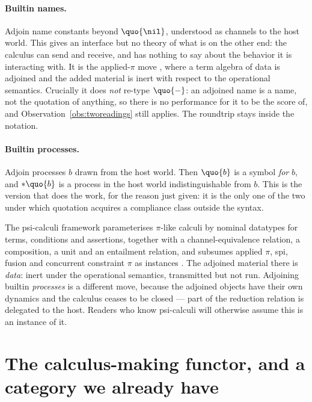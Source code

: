 \paragraph{Builtin names.}
Adjoin name constants beyond $\quo{\nil}$, understood as channels
to the host world.
This gives an interface but no theory of what is on the other end:
the calculus can send and receive, and has nothing to say about the
behavior it is interacting with.
It is the applied-$\pi$ move \cite{abadi2001}, where a term algebra
of data is adjoined and the added material is inert with respect to
the operational semantics.
Crucially it does \emph{not} re-type $\quo{-}$: an adjoined name is
a name, not the quotation of anything, so there is no performance
for it to be the score of, and Observation~\ref{obs:tworeadings}
still applies.
The roundtrip stays inside the notation.

\paragraph{Builtin processes.}
Adjoin processes $b$ drawn from the host world.
Then $\quo{b}$ is a symbol \emph{for} $b$, and $*\quo{b}$ is a
process in the host world indistinguishable from $b$.
This is the version that does the work, for the reason just given:
it is the only one of the two under which quotation acquires a
compliance class outside the syntax.

\begin{remark}
\label{rem:psi}
The psi-calculi framework parameterises $\pi$-like calculi by
nominal datatypes for terms, conditions and assertions, together
with a channel-equivalence relation, a composition, a unit and an
entailment relation, and subsumes applied $\pi$, spi, fusion and
concurrent constraint $\pi$ as instances \cite{bengtson2011}.
The adjoined material there is \emph{data}: inert under the
operational semantics, transmitted but not run.
Adjoining builtin \emph{processes} is a different move, because the
adjoined objects have their own dynamics and the calculus ceases to
be closed --- part of the reduction relation is delegated to the
host.
Readers who know psi-calculi will otherwise assume this is an
instance of it.
\end{remark}

\section{The calculus-making functor, and a category we already have}
\label{sec:functor}


